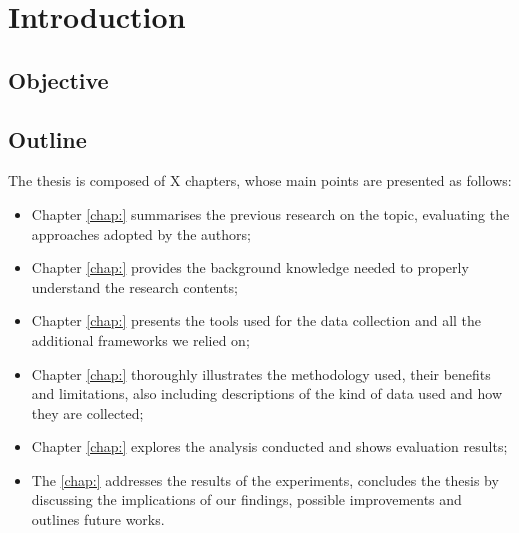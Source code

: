 \chapter{Introduction}
\label{chap:intro}



\lipsum[1]




\section{Objective}
\label{sec:objective}

\lipsum[2-5]




\section{Outline}
\label{sec:outline}


The thesis is composed of X chapters, whose main points are presented as follows:
\begin{itemize}
	\item Chapter \ref{chap:} summarises the previous research 
	on the topic, evaluating the approaches adopted by the authors;
	
	\item Chapter \ref{chap:} provides the background knowledge 
	needed to properly understand the research contents;
	
	\item Chapter \ref{chap:} presents the tools used for the data collection 
	and all the additional frameworks we relied on;
		
	\item Chapter \ref{chap:} thoroughly illustrates the methodology used, 
	their benefits and limitations, also including descriptions of the kind of data 
	used and how they are collected;

	\item Chapter \ref{chap:} explores the analysis conducted and 
	shows evaluation results;	
	
	\item The \ref{chap:} addresses the results of the 
	experiments, concludes the thesis by discussing the implications of our findings, 
	possible improvements and outlines future works.
\end{itemize}





